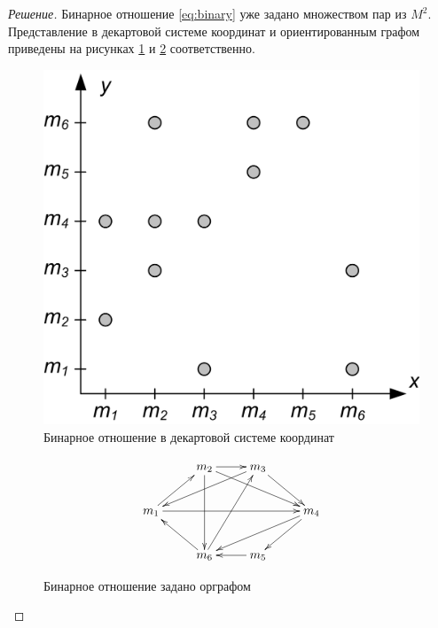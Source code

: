 \begin{proof}[Решение]
    Бинарное отношение \eqref{eq:binary} уже задано множеством пар из $M^2$. Представление в декартовой системе координат и ориентированным графом приведены на рисунках \ref{fig:binaryR} и \ref{fig:binaryRGraph} соответственно.
    
    \begin{figure}
        \centering
        \includegraphics{fig/binaryR}
        \caption{Бинарное отношение в декартовой системе координат}
        \label{fig:binaryR}
    \end{figure} 

    \begin{figure}
        \[
            \xymatrix{
                *{}
                    &m_2 \ar@{->}[r]\ar@{->}[drr]\ar@{->}[dd]
                        &m_3 \ar@{->}[dll]\ar@{->}[dr]
                            &*{}
                                \\
                m_1 \ar@{->}[ur]\ar@{->}[rrr]
                    &*{}
                        &*{}
                            &m_4 \ar@{->}[dl]\ar@{->}[dll]
                                \\
                *{}
                    &m_6 \ar@{->}[ul]\ar@{->}[uur]
                        &m_5 \ar@{->}[l]
                            &*{}
            }
        \]
        \caption{Бинарное отношение задано орграфом}
        \label{fig:binaryRGraph}
    \end{figure} 


\end{proof}
